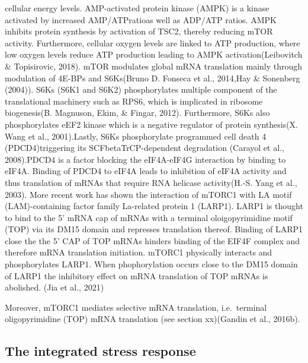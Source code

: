 \documentclass[12pt,openany]{book}
\begin{document}
cellular energy levels. AMP-activated protein kinase (AMPK) is a kinase
activated by increased AMP/ATPratioas well as ADP/ATP ratios. AMPK
inhibits protein synthesis by activation of TSC2, thereby reducing mTOR
activity. Furthermore, cellular oxygen levels are linked to ATP
production, where low oxygen levels reduce ATP production leading to
AMPK activation(Leibovitch \& Topisirovic, 2018). mTOR modulates global
mRNA translation mainly through modulation of 4E-BPs and S6Ks(Bruno D.
Fonseca et al., 2014,Hay \& Sonenberg (2004)). S6Ks (S6K1 and S6K2)
phosphorylates multiple component of the translational machinery such as
RPS6, which is implicated in ribosome biogenesis(B. Magnuson, Ekim, \&
Fingar, 2012). Furthermore, S6Ks also phosphorylates eEF2 kinase which
is a negative regulator of protein synthesis(X. Wang et al.,
2001).Lastly, S6Ks phosphorylate programmed cell death 4
(PDCD4)triggering its SCFbetaTrCP-dependent degradation (Carayol et al.,
2008).PDCD4 is a factor blocking the eIF4A-eIF4G interaction by binding
to eIF4A. Binding of PDCD4 to eIF4A leads to inhibition of eIF4A
activity and thus translation of mRNAs that require RNA helicase
activity(H.-S. Yang et al., 2003). More recent work has shown the
interaction of mTORC1 with LA motif (LAM)-containing factor family
La-related protein 1 (LARP1). LARP1 is thought to bind to the 5' mRNA
cap of mRNAs with a terminal oloigopyrimidine motif (TOP) via its DM15
domain and represses translation thereof. Binding of LARP1 close the the
5' CAP of TOP mRNAs hinders binding of the EIF4F complex and therefore
mRNA translation initiation. mTORC1 physically interacts and
phosphorylates LARP1. When phophorylation occurs close to the DM15
domain of LARP1 the inhibitory effect on mRNA translation of TOP mRNAs
is abolished. (Jia et al., 2021)

Moreover, mTORC1 mediates selective mRNA translation, i.e.~terminal
oligopyrimidine (TOP) mRNA translation (see section xx)(Gandin et al.,
2016b).

\subsection{The integrated stress response}
\end{document}
